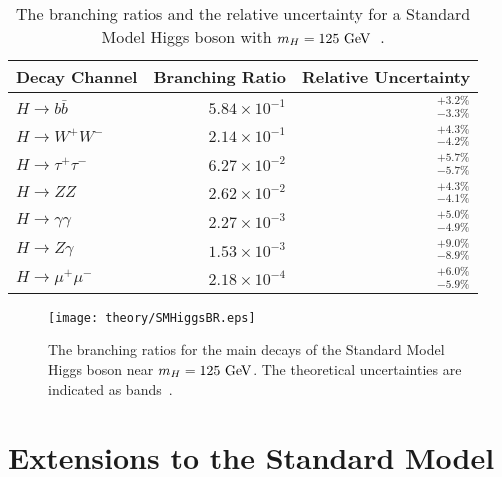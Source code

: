 \begin{table}[htpb]
 \centering
 \caption[The branching ratios and the relative uncertainty for a Standard Model Higgs boson with $m_{H}=125~\GeV$.]{%
  The branching ratios and the relative uncertainty for a Standard Model Higgs boson with $m_{H}=125~\GeV$~\cite{PDG2018:Ch11}.}
 \begin{tabular}{@{}lrr@{}} \toprule
  Decay Channel           & Branching Ratio       & Relative Uncertainty \\ \midrule
  $H\to b\bar{b}$         & $5.84 \times 10^{-1}$ & $_{-3.3\%}^{+3.2\%}$ \\
  \addlinespace[0.3em]
  $H\to W^{+}W^{-}$       & $2.14 \times 10^{-1}$ & $_{-4.2\%}^{+4.3\%}$ \\
  \addlinespace[0.3em]
  $H\to \tau^{+}\tau^{-}$ & $6.27 \times 10^{-2}$ & $_{-5.7\%}^{+5.7\%}$ \\
  \addlinespace[0.3em]
  $H\to ZZ$               & $2.62 \times 10^{-2}$ & $_{-4.1\%}^{+4.3\%}$ \\
  \addlinespace[0.3em]
  $H\to \gamma\gamma$     & $2.27 \times 10^{-3}$ & $_{-4.9\%}^{+5.0\%}$ \\
  \addlinespace[0.3em]
  $H\to Z\gamma$          & $1.53 \times 10^{-3}$ & $_{-8.9\%}^{+9.0\%}$ \\
  \addlinespace[0.3em]
  $H\to \mu^{+}\mu^{-}$   & $2.18 \times 10^{-4}$ & $_{-5.9\%}^{+6.0\%}$ \\
  \bottomrule
 \end{tabular}\label{table:Higgs_BRs}%
\end{table}

\begin{figure}
 \centering
 \texttt{[image: theory/SMHiggsBR.eps]}
 \caption[The branching ratios for the main decays of the Standard Model Higgs boson near $m_{H}=125~\GeV$.]{%
  The branching ratios for the main decays of the Standard Model Higgs boson near $m_{H}=125~\GeV$.
  The theoretical uncertainties are indicated as bands~\cite{PDG2018:Ch11}.}
 \label{fig:Higgs_BRs}
\end{figure}

\section{Extensions to the Standard Model}

